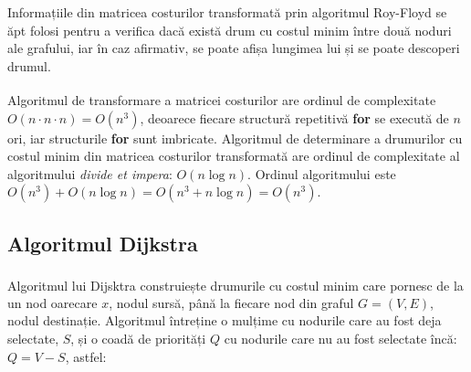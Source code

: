 \documentclass[9pt,a4paper]{report}
\begin{document}
\begin{center}
\begin{minipage}[t]{\textwidth}
\begin{center}
        \end{center}
    \end{minipage}
\end{center}

Informațiile din matricea costurilor transformată prin algoritmul Roy-Floyd se ăpt folosi pentru a verifica dacă există drum cu costul minim între două noduri ale grafului, iar în caz afirmativ, se poate afișa lungimea lui și se poate descoperi drumul.

Algoritmul de transformare a matricei costurilor are ordinul de complexitate\textsuperscript{\cite{milosescu}} $O(n \cdot n \cdot n) = O(n^3)$, deoarece fiecare structură repetitivă \textbf{for} se execută de $n$ ori, iar structurile \textbf{for} sunt imbricate. Algoritmul de determinare a drumurilor cu costul minim din matricea costurilor transformată are ordinul de complexitate al algoritmului \textit{divide et impera}: $O(n \log n)$. Ordinul algoritmului este $O(n^3) + O(n \log n) = O(n^3 + n \log n) = O(n^3)$.

\subsection{Algoritmul Dijkstra}

Algoritmul lui Dijsktra\textsuperscript{\cite{milosescu}} construiește drumurile cu costul minim care pornesc de la un nod oarecare $x$, nodul sursă, până la fiecare nod din graful $G = (V, E)$, nodul destinație. Algoritmul întreține o mulțime cu nodurile care au fost deja selectate, $S$, și o coadă de priorități $Q$ cu nodurile care nu au fost selectate încă: $Q = V - S$, astfel:
\end{document}
